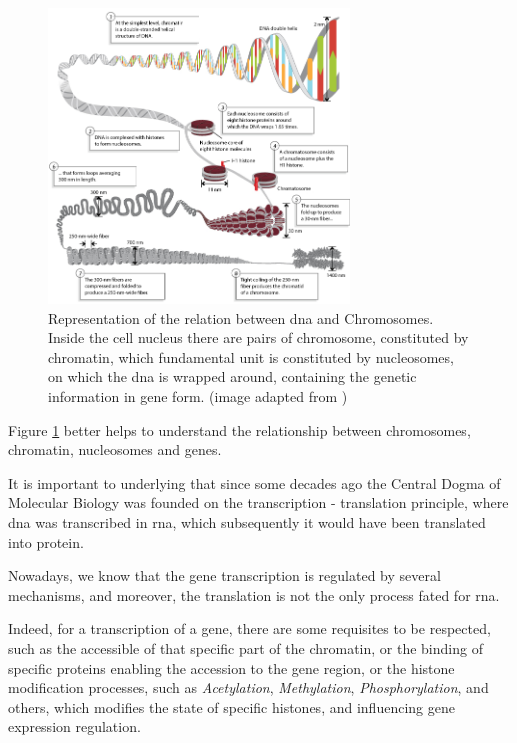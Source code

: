 \begin{figure}[h]
\centering
\includegraphics[width=8cm, keepaspectratio]{img/intro/dna2.jpg}
\caption[Chromosomes and \gls{dna}]{Representation of the relation between \gls{dna} and Chromosomes.
Inside the cell nucleus there are pairs of chromosome, constituted by chromatin, which fundamental unit is constituted by nucleosomes, on which the \gls{dna} is wrapped around, containing the genetic information in gene form. (image adapted from \cite{Annunziato2008})}
\label{fig:dnachromosome}
\end{figure}

Figure \ref{fig:dnachromosome} better helps  to understand the relationship between chromosomes, chromatin, nucleosomes and genes.

It is important to underlying that since some decades ago the Central Dogma of Molecular Biology was founded on the transcription - translation principle, where \gls{dna} was transcribed in \gls{rna}, which subsequently it would have been translated into protein.

Nowadays, we know that the gene transcription is regulated by several mechanisms, and moreover, the translation is not the only process fated for \gls{rna}.

Indeed, for a transcription of a gene, there are some requisites to be respected, such as the accessible of that specific part of the chromatin, or the binding of specific proteins enabling the accession to the gene region, or the histone modification processes, such as \textit{Acetylation}, \textit{Methylation}, \textit{Phosphorylation}, and others, which modifies the state of specific histones, and influencing gene expression regulation. 
  

